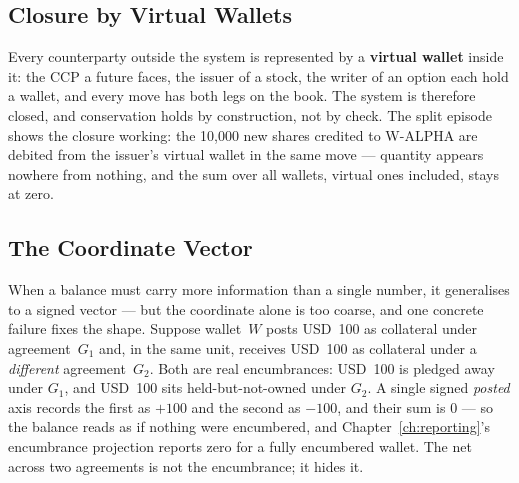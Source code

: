 \documentclass[11pt,a4paper]{article}
\newcommand{\USD}[1]{\mbox{USD~#1}}
\begin{document}
\subsection{Closure by Virtual Wallets}

Every counterparty outside the system is represented by a \textbf{virtual wallet} inside
it: the CCP a future faces, the issuer of a stock, the writer of an option each hold a
wallet, and every move has both legs on the book. The system is therefore closed, and
conservation holds by construction, not by check. The split episode shows the closure
working: the 10{,}000 new shares credited to W-ALPHA are debited from the issuer's
virtual wallet in the same move --- quantity appears nowhere from nothing, and the sum
over all wallets, virtual ones included, stays at zero.

\subsection{The Coordinate Vector}\label{sec:coordinate-vector}

When a balance must carry more information than a single number, it generalises to a
signed vector --- but the coordinate alone is too coarse, and one concrete failure fixes
the shape. Suppose wallet~$W$ posts \USD{100} as collateral under agreement~$G_1$ and,
in the same unit, receives \USD{100} as collateral under a \emph{different}
agreement~$G_2$. Both are real encumbrances: \USD{100} is pledged away under $G_1$, and
\USD{100} sits held-but-not-owned under $G_2$. A single signed \emph{posted} axis records
the first as $+100$ and the second as $-100$, and their sum is $0$ --- so the balance reads
as if nothing were encumbered, and Chapter~\ref{ch:reporting}'s encumbrance projection
reports zero for a fully encumbered wallet. The net across two agreements is not the
encumbrance; it hides it.
\end{document}
